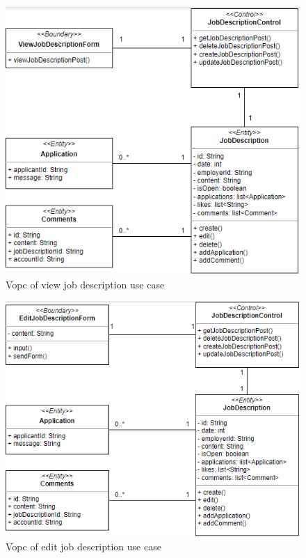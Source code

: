 \documentclass[a4paper]{article}
\begin{document}
\begin{figure}[H]
    \centering
    \includegraphics[width=1.0\textwidth]{vopc_view_jd.png}
    \caption{Vopc of view job description use case}
    \label{fig:fig27}
\end{figure}

\begin{figure}[H]
    \centering
    \includegraphics[width=1.0\textwidth]{vopc_edit_jd.png}
    \caption{Vopc of edit job description use case}
    \label{fig:fig28}
\end{figure}
\end{document}
